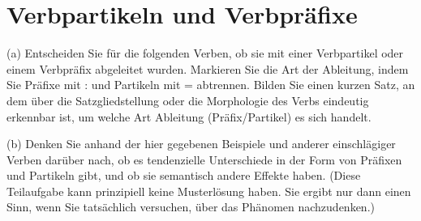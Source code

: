 \newpage

\section{Verbpartikeln und Verbpräfixe}

(a) Entscheiden Sie für die folgenden Verben, ob sie mit einer Verbpartikel oder einem Verbpräfix abgeleitet wurden.
Markieren Sie die Art der Ableitung, indem Sie Präfixe mit : und Partikeln mit = abtrennen.
Bilden Sie einen kurzen Satz, an dem über die Satzgliedstellung oder die Morphologie des Verbs eindeutig erkennbar ist, um welche Art Ableitung (Präfix\slash Partikel) es sich handelt.

(b) Denken Sie anhand der hier gegebenen Beispiele und anderer einschlägiger Verben darüber nach, ob es tendenzielle Unterschiede in der Form von Präfixen und Partikeln gibt, und ob sie semantisch andere Effekte haben.
(Diese Teilaufgabe kann prinzipiell keine Musterlösung haben.
Sie ergibt nur dann einen Sinn, wenn Sie tatsächlich versuchen, über das Phänomen nachzudenken.)

